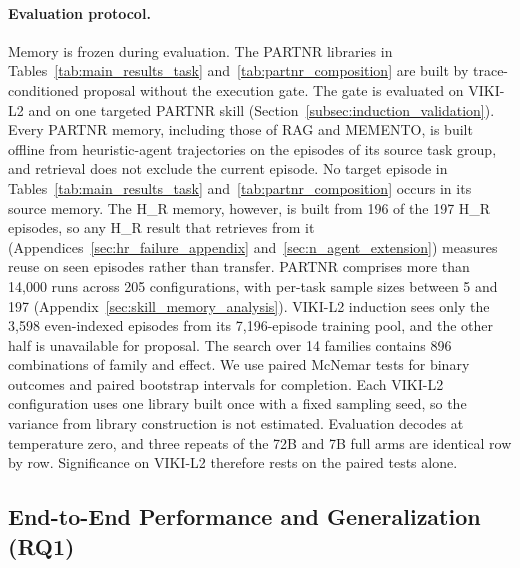 \documentclass{article}
\theoremstyle{plain}
\theoremstyle{definition}
\theoremstyle{remark}
\begin{document}
\paragraph{Evaluation protocol.}
Memory is frozen during evaluation. The PARTNR libraries in Tables~\ref{tab:main_results_task} and~\ref{tab:partnr_composition} are built by trace-conditioned proposal without the execution gate. The gate is evaluated on VIKI-L2 and on one targeted PARTNR skill (Section~\ref{subsec:induction_validation}). Every PARTNR memory, including those of RAG and MEMENTO, is built offline from heuristic-agent trajectories on the episodes of its source task group, and retrieval does not exclude the current episode. No target episode in Tables~\ref{tab:main_results_task} and~\ref{tab:partnr_composition} occurs in its source memory. The H\_R memory, however, is built from 196 of the 197 H\_R episodes, so any H\_R result that retrieves from it (Appendices~\ref{sec:hr_failure_appendix} and~\ref{sec:n_agent_extension}) measures reuse on seen episodes rather than transfer. PARTNR comprises more than 14{,}000 runs across 205 configurations, with per-task sample sizes between 5 and 197 (Appendix~\ref{sec:skill_memory_analysis}). VIKI-L2 induction sees only the 3{,}598 even-indexed episodes from its 7{,}196-episode training pool, and the other half is unavailable for proposal. The search over 14 families contains 896 combinations of family and effect. We use paired McNemar tests for binary outcomes and paired bootstrap intervals for completion. Each VIKI-L2 configuration uses one library built once with a fixed sampling seed, so the variance from library construction is not estimated. Evaluation decodes at temperature zero, and three repeats of the 72B and 7B full arms are identical row by row. Significance on VIKI-L2 therefore rests on the paired tests alone.

\subsection{End-to-End Performance and Generalization (RQ1)}
\label{subsec:main_results}
\label{subsec:generalization}
\end{document}
